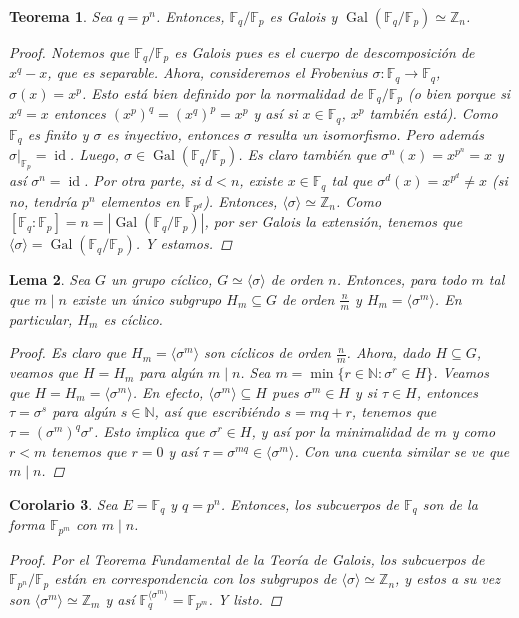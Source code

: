 \documentclass[12pt]{book}
\newtheorem{teo}{Teorema}[section]
\newtheorem{lem}[teo]{Lema}
\newtheorem{cor}[teo]{Corolario}
\theoremstyle{definition}
\newcommand{\ZZ}{\mathbb{Z}}      %
\newcommand{\NN}{\mathbb{N}}
\newcommand{\FF}{\mathbb{F}}
\DeclareMathOperator{\id}{id}
\DeclareMathOperator{\Gal}{Gal}
\begin{document}
\begin{teo}
Sea $q=p^n$. Entonces, $\FF_q/\FF_p$ es Galois y $\Gal(\FF_q/\FF_p)\simeq \ZZ_n$.
\begin{proof}
Notemos que $\FF_q/\FF_p$ es Galois pues es el cuerpo de descomposición de $x^q - x$, que es separable. Ahora, consideremos el Frobenius $\sigma:\FF_q\to\FF_q$, $\sigma(x)=x^p$. Esto está bien definido por la normalidad de $\FF_q/\FF_p$ (o bien porque si $x^q = x$ entonces $(x^p)^q = (x^q)^p = x^p$ y así si $x\in\FF_q$, $x^p$ también está). Como $\FF_q$ es finito y $\sigma$ es inyectivo, entonces $\sigma$ resulta un isomorfismo. Pero además $\left.\sigma\right|_{\FF_p}=\id$. Luego, $\sigma\in\Gal(\FF_q/\FF_p)$. Es claro también que $\sigma^n(x) = x^{p^n} = x$ y así $\sigma^n = \id$. Por otra parte, si $d<n$, existe $x\in\FF_q$ tal que $\sigma^d(x) = x^{p^d} \neq x$ (si no, tendría $p^n$ elementos en $\FF_{p^d}$).  Entonces, $\langle \sigma\rangle \simeq \ZZ_n$. Como $[\FF_q:\FF_p]=n = |\Gal(\FF_q/\FF_p)|$, por ser Galois la extensión, tenemos que $\langle\sigma \rangle = \Gal(\FF_q/\FF_p)$. Y estamos.
\end{proof}
\end{teo}

\begin{lem}
Sea $G$ un grupo cíclico, $G\simeq\langle \sigma\rangle$ de orden $n$. Entonces, para todo $m$ tal que $m\mid n$ existe un único subgrupo $H_m\subseteq G$ de orden $\frac{n}{m}$ y $H_m = \langle \sigma^m\rangle$. En particular, $H_m$ es cíclico.
\begin{proof}
Es claro que $H_m = \langle \sigma^m \rangle$ son cíclicos de orden $\frac{n}{m}$. Ahora, dado $H\subseteq G$, veamos que $H=H_m$ para algún $m\mid n$. Sea $m=\min\{r\in\NN : \sigma^r \in H\}$. Veamos que $H=H_m = \langle \sigma^m\rangle$. En efecto, $\langle\sigma^m\rangle\subseteq H$ pues $\sigma^m\in H$ y si $\tau\in H$, entonces $\tau = \sigma^s$ para algún $s\in\NN$, así que escribiéndo $s=mq+r$, tenemos que $\tau=(\sigma^m)^q\sigma^r$. Esto implica que $\sigma^r \in H$, y así por la minimalidad de $m$ y como $r<m$ tenemos que $r=0$ y así $\tau = \sigma^{mq}\in\langle\sigma^m\rangle$. Con una cuenta similar se ve que $m\mid n$.
\end{proof}
\end{lem}

\begin{cor}
Sea $E=\FF_q$ y $q=p^n$. Entonces, los subcuerpos de $\FF_q$ son de la forma $\FF_{p^m}$ con $m\mid n$.
\begin{proof}
Por el Teorema Fundamental de la Teoría de Galois, los subcuerpos de $\FF_{p^n}/\FF_p$ están en correspondencia con los subgrupos de $\langle\sigma\rangle\simeq\ZZ_n$, y estos a su vez son $\langle\sigma^m\rangle\simeq\ZZ_m$ y así $\FF_q^{\langle \sigma^m\rangle} = \FF_{p^m}$. Y listo.
\end{proof}
\end{cor}
\end{document}
